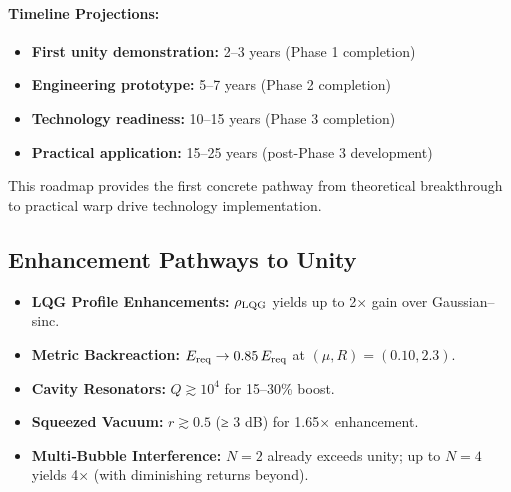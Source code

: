 \documentclass[11pt]{article}
\begin{document}
\paragraph{Timeline Projections:}
\begin{itemize}
  \item \textbf{First unity demonstration:} 2--3 years (Phase 1 completion)
  \item \textbf{Engineering prototype:} 5--7 years (Phase 2 completion)
  \item \textbf{Technology readiness:} 10--15 years (Phase 3 completion)
  \item \textbf{Practical application:} 15--25 years (post-Phase 3 development)
\end{itemize}

This roadmap provides the first concrete pathway from theoretical breakthrough to practical warp drive technology implementation.

\subsection*{Enhancement Pathways to Unity}
\begin{itemize}
  \item \textbf{LQG Profile Enhancements:} $\rho_{\rm LQG}$ yields up to 2× gain over Gaussian–sinc.
  \item \textbf{Metric Backreaction:} $E_{\rm req}\rightarrow0.85\,E_{\rm req}$ at $(\mu,R)=(0.10,2.3)$.
  \item \textbf{Cavity Resonators:} $Q\gtrsim10^4$ for 15–30\% boost.
  \item \textbf{Squeezed Vacuum:} $r\gtrsim0.5$ (≥ 3 dB) for 1.65× enhancement.
  \item \textbf{Multi‐Bubble Interference:} $N=2$ already exceeds unity; up to $N=4$ yields 4× (with diminishing returns beyond).
\end{itemize}
\end{document}
